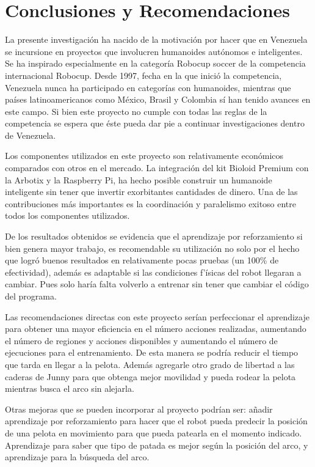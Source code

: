 \chapter{Conclusiones y Recomendaciones} \label{chapter:conclusiones}

\label{chap:conclusiones}

La presente investigación ha nacido de la motivación por hacer que en Venezuela se incursione en proyectos que involucren humanoides autónomos e inteligentes. Se ha inspirado especialmente en la categoría Robocup soccer de la competencia internacional Robocup. Desde 1997, fecha en la que inició la competencia, Venezuela nunca ha participado en categorías con humanoides, mientras que países latinoamericanos como México, Brasil y Colombia sí han tenido avances en este campo. Si bien este proyecto no cumple con todas las reglas de la competencia se espera que éste pueda dar pie a continuar investigaciones dentro de Venezuela.

Los componentes utilizados en este proyecto son relativamente económicos comparados con otros en el mercado. La integración del kit Bioloid Premium con la Arbotix y la Raspberry Pi, ha hecho posible construir un humanoide inteligente sin tener que invertir exorbitantes cantidades de dinero. Una de las contribuciones más importantes es la coordinación y paralelismo exitoso entre todos los componentes utilizados.

De los resultados obtenidos se evidencia que el aprendizaje por reforzamiento si bien genera mayor trabajo, es recomendable su utilizaci\'on no solo por el hecho que logr\'o buenos resultados en relativamente pocas pruebas (un 100\% de efectividad), adem\'as es adaptable si las condiciones f'\'isicas del robot llegaran a cambiar. Pues solo haría falta volverlo a entrenar sin tener que cambiar el código del programa.
 
Las recomendaciones directas con este proyecto ser\'ian perfeccionar el aprendizaje para obtener una mayor eficiencia en el n\'umero acciones realizadas, aumentando el número de regiones y acciones disponibles y aumentando el número de ejecuciones para el entrenamiento. De esta manera se podría reducir el tiempo que tarda en llegar a la pelota. Además agregarle otro grado de libertad a las caderas de Junny para que obtenga mejor movilidad y pueda rodear la pelota mientras busca el arco sin alejarla. 

Otras mejoras que se pueden incorporar al proyecto podrían ser: añadir aprendizaje por reforzamiento para hacer que el robot pueda predecir la posición de una pelota en movimiento para que pueda patearla en el momento indicado. Aprendizaje para saber que tipo de patada es mejor seg\'un la posición del arco, y aprendizaje para la búsqueda del arco.


